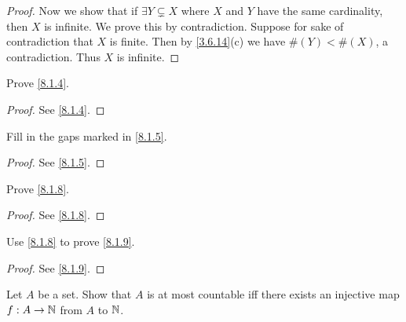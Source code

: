 \begin{proof}
  Now we show that if \(\exists Y \subsetneq X\) where \(X\) and \(Y\) have the same cardinality, then \(X\) is infinite.
  We prove this by contradiction.
  Suppose for sake of contradiction that \(X\) is finite.
  Then by \cref{3.6.14}(c) we have \(\#(Y) < \#(X)\), a contradiction.
  Thus \(X\) is infinite.
\end{proof}

\begin{ex}\label{ex:8.1.2}
  Prove \cref{8.1.4}.
\end{ex}

\begin{proof}
  See \cref{8.1.4}.
\end{proof}

\begin{ex}\label{ex:8.1.3}
  Fill in the gaps marked in \cref{8.1.5}.
\end{ex}

\begin{proof}
  See \cref{8.1.5}.
\end{proof}

\begin{ex}\label{ex:8.1.4}
  Prove \cref{8.1.8}.
\end{ex}

\begin{proof}
  See \cref{8.1.8}.
\end{proof}

\begin{ex}\label{ex:8.1.5}
  Use \cref{8.1.8} to prove \cref{8.1.9}.
\end{ex}

\begin{proof}
  See \cref{8.1.9}.
\end{proof}

\begin{ex}\label{ex:8.1.6}
  Let \(A\) be a set.
  Show that \(A\) is at most countable iff there exists an injective map \(f : A \to \mathbb{N}\) from \(A\) to \(\mathbb{N}\).
\end{ex}

